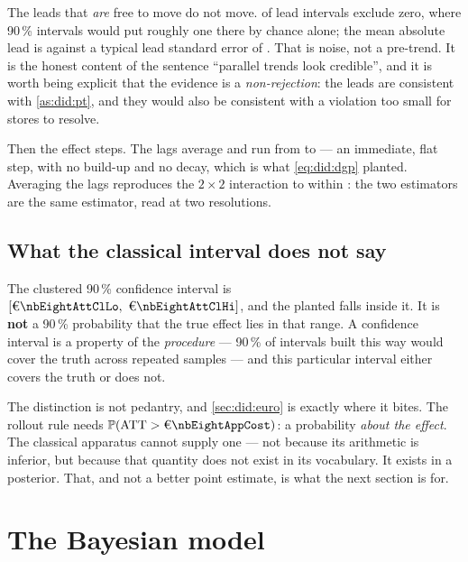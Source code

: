 The \nbEightEsNLeads{} leads that \emph{are} free to move do not move.
\nbEightEsLeadsOut{} of \nbEightEsNLeads{} lead intervals exclude zero, where 90\,\% intervals
would put roughly one there by chance alone; the mean absolute lead is
\eur{\nbEightEsMeanAbsLead} against a typical lead standard error of \eur{\nbEightEsLeadSe}. That
is noise, not a pre-trend. It is the honest content of the sentence ``parallel trends look
credible'', and it is worth being explicit that the evidence is a \emph{non-rejection}: the leads
are consistent with \cref{as:did:pt}, and they would also be consistent with a violation too small
for \nbEightNStores{} stores to resolve.

Then the effect steps. The \nbEightEsNLags{} lags average \eur{\nbEightEsLagMean} and run from
\eur{\nbEightEsLagMin} to \eur{\nbEightEsLagMax} --- an immediate, flat step, with no build-up and
no decay, which is what \cref{eq:did:dgp} planted. Averaging the lags reproduces the $2 \times 2$
interaction to within \eur{\nbEightEsLagVsDid}: the two estimators are the same estimator, read at
two resolutions.

\subsection*{What the classical interval does not say}

The clustered 90\,\% confidence interval is
$[\eur{\nbEightAttClLo},\ \eur{\nbEightAttClHi}]$, and the planted \eur{\nbEightTrueEffect} falls
inside it. It is \textbf{not} a 90\,\% probability that the true effect lies in that range. A
confidence interval is a property of the \emph{procedure} --- 90\,\% of intervals built this way
would cover the truth across repeated samples --- and this particular interval either covers the
truth or does not.

The distinction is not pedantry, and \cref{sec:did:euro} is exactly where it bites. The rollout
rule needs $\Prob(\text{ATT} > \eur{\nbEightAppCost})$: a probability \emph{about the effect}. The
classical apparatus cannot supply one --- not because its arithmetic is inferior, but because that
quantity does not exist in its vocabulary. It exists in a posterior. That, and not a better point
estimate, is what the next section is for.

\section{The Bayesian model}
\label{sec:did:bayes}

